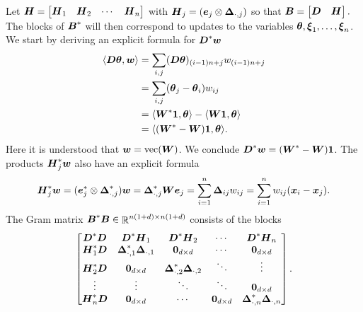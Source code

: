 \documentclass{article}
\begin{document}
Let
\(
\boldsymbol{H} = \begin{bmatrix}
    \boldsymbol{H}_{1} & \boldsymbol{H}_{2} & \cdots & \boldsymbol{H}_{n}
\end{bmatrix}
\)
with \(\boldsymbol{H}_{j} = (\boldsymbol{e}_{j} \otimes \boldsymbol{\Delta}_{\cdot, j})\) so that
\(
\boldsymbol{B}
=
\begin{bmatrix}
    \boldsymbol{D} & \boldsymbol{H}
\end{bmatrix}.
\)
The blocks of \(\boldsymbol{B}^{\ast}\) will then correspond to updates to the variables \(\boldsymbol{\theta}, \boldsymbol{\xi}_{1}, \ldots, \boldsymbol{\xi}_{n}\).
We start by deriving an explicit formula for \(\boldsymbol{D}^{\ast} \boldsymbol{w}\)
\begin{equation*}
    \begin{split}
        \langle{\boldsymbol{D}\boldsymbol{\theta}, \boldsymbol{w}}\rangle
        &=
        \sum_{i,j} (\boldsymbol{D} \boldsymbol{\theta})_{(i-1)n+j} w_{(i-1)n+j} \\
        &=
        \sum_{i,j} (\boldsymbol{\theta}_{j} - \boldsymbol{\theta}_{i}) w_{ij} \\
        &=
        \langle{\boldsymbol{W}^{\ast} \boldsymbol{1}, \boldsymbol{\theta}}\rangle
        -
        \langle{\boldsymbol{W}\boldsymbol{1}, \boldsymbol{\theta}}\rangle \\
        &=
        \langle{(\boldsymbol{W}^{\ast} - \boldsymbol{W}) \boldsymbol{1}, \boldsymbol{\theta}}\rangle.
    \end{split}
\end{equation*}
Here it is understood that \(\boldsymbol{w} = \mathop{\rm vec}\nolimits(\boldsymbol{W})\).
We conclude \(\boldsymbol{D}^{\ast} \boldsymbol{w} = (\boldsymbol{W}^{\ast} - \boldsymbol{W}) \boldsymbol{1}\).
The products \(\boldsymbol{H}_{j}^{\ast} \boldsymbol{w}\) also have an explicit formula
\begin{equation*}
    \boldsymbol{H}_{j}^{\ast} \boldsymbol{w}
    =
    (\boldsymbol{e}_{j}^{\ast} \otimes \boldsymbol{\Delta}_{\cdot,j}^{\ast}) \boldsymbol{w}
    =
    \boldsymbol{\Delta}_{\cdot,j}^{\ast} \boldsymbol{W} \boldsymbol{e}_{j}
    =
    \sum_{i=1}^{n} \boldsymbol{\Delta}_{ij} w_{ij}
    =
    \sum_{i=1}^{n} w_{ij}(\boldsymbol{x}_{i} - \boldsymbol{x}_{j}).
\end{equation*}
The Gram matrix \(\boldsymbol{B}^{\ast} \boldsymbol{B} \in \mathop{\mathbb{R}}\nolimits^{n(1+d) \times n(1+d)}\) consists of the blocks
\begin{equation*}
    \begin{bmatrix}
        \boldsymbol{D}^{\ast} \boldsymbol{D}
        & \boldsymbol{D}^{\ast} \boldsymbol{H}_{1}
        & \boldsymbol{D}^{\ast} \boldsymbol{H}_{2}
        & \cdots
        & \boldsymbol{D}^{\ast} \boldsymbol{H}_{n} \\
        \boldsymbol{H}_{1}^{\ast} \boldsymbol{D}
        & \boldsymbol{\Delta}_{\cdot,1}^{\ast} \boldsymbol{\Delta}_{\cdot,1}
        & \boldsymbol{0}_{d \times d}
        & \cdots
        & \boldsymbol{0}_{d \times d} \\
        \boldsymbol{H}_{2}^{\ast} \boldsymbol{D}
        & \boldsymbol{0}_{d \times d}
        & \boldsymbol{\Delta}_{\cdot,2}^{\ast} \boldsymbol{\Delta}_{\cdot,2}
        & \ddots
        & \vdots \\
        \vdots
        & \vdots
        & \ddots
        & \ddots
        & \boldsymbol{0}_{d \times d} \\
       \boldsymbol{H}_{n}^{\ast} \boldsymbol{D}
        & \boldsymbol{0}_{d \times d}
        & \cdots
        & \boldsymbol{0}_{d \times d}
        &\boldsymbol{\Delta}_{\cdot,n}^{\ast} \boldsymbol{\Delta}_{\cdot,n}
    \end{bmatrix}.
\end{equation*}
\end{document}
